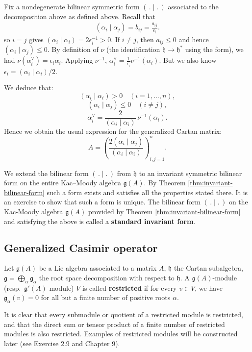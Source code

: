 \documentclass[12pt]{article}
\begin{document}
Fix a nondegenerate bilinear symmetric form $(\,.\mid.\,)$ associated to
the decomposition above as defined above. Recall that \begin{align*}
    (\alpha_i\mid \alpha_j) = b_{ij} = \frac{a_{ij}}{\epsilon_i}.
\end{align*}
so $i=j$ gives $(\alpha_i\mid \alpha_i) = 2\epsilon_i^{-1} > 0$. If $i\neq j$, then $a_{ij}\leq 0$ and hence $(\alpha_i\mid \alpha_j)\leq 0$. By definition of $\nu$ (the identification $\mathfrak{h}\to\mathfrak{h}^*$ using the form), we had
$\nu(\alpha_i^\vee)=\epsilon_i\alpha_i$.
Applying $\nu^{-1}$,
$\alpha_i^\vee = \frac{1}{\epsilon_i}\nu^{-1}(\alpha_i)$.
But we also know
$\epsilon_i=(\alpha_i\mid \alpha_i)/2$.

We deduce that:
\[
    (\alpha_i\mid \alpha_i)>0 \quad (i=1,\dots,n),
\]
\[
    (\alpha_i\mid \alpha_j)\leq 0 \quad (i\neq j),
\]
\[
    \alpha_i^\vee = \frac{2}{(\alpha_i\mid \alpha_i)}\,\nu^{-1}(\alpha_i).
\]
Hence we obtain the usual expression for the generalized Cartan matrix:
\[
    A=\left(\frac{2(\alpha_i\mid \alpha_j)}{(\alpha_i\mid \alpha_i)}\right)_{i,j=1}^n.
\]

We extend the bilinear form $(\,.\mid.\,)$ from $\mathfrak h$ to an
invariant symmetric bilinear form on the entire Kac–Moody algebra
$\mathfrak g(A)$. By Theorem \ref{thm:invariant-bilinear-form} such a form exists and satisfies all the properties stated there. It is an exercise to show that such a form is unique. The bilinear form $(\,.\mid.\,)$ on the Kac-Moody algebra $\mathfrak g(A)$ provided by Theorem \ref{thm:invariant-bilinear-form} and
satisfying the above is called a \textbf{standard invariant form}.

\subsection{Generalized Casimir operator}
Let $\mathfrak{g}(A)$ be a Lie algebra associated to a matrix $A$, 
$\mathfrak{h}$ the Cartan subalgebra, 
$\mathfrak{g} = \bigoplus_\alpha \mathfrak{g}_\alpha$ the root space decomposition with respect to $\mathfrak{h}$. 
A $\mathfrak{g}(A)$-module (resp.\ $\mathfrak{g}'(A)$-module) $V$ is called \textbf{restricted} if for every $v\in V$, 
we have $\mathfrak{g}_\alpha(v)=0$ for all but a finite number of positive roots $\alpha$.  

It is clear that every submodule or quotient of a restricted module is restricted, and that the direct sum or tensor product of a finite number of restricted modules is also restricted. Examples of restricted modules will be constructed later (see Exercise 2.9 and Chapter 9).
\end{document}
